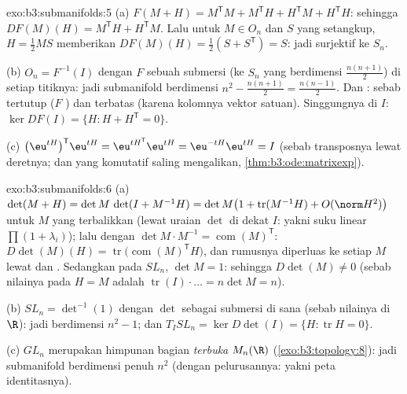 \begin{solution}{exo:b3:submanifolds:5}
(a) $F(M + H) = M^{\mathsf T}M + M^{\mathsf T}H + H^{\mathsf
T}M + H^{\mathsf T}H$: sehingga $DF(M)(H) = M^{\mathsf T}H +
H^{\mathsf T}M$. Lalu untuk $M \in O_n$ dan $S$ yang setangkup, $H =
\frac12MS$ memberikan $DF(M)(H) = \frac12(S + S^{\mathsf T}) = S$:
jadi surjektif ke $S_n$.

(b) $O_n = F^{-1}(I)$ dengan $F$ sebuah submersi (ke $S_n$ yang
berdimensi $\frac{n(n+1)}2$) di setiap titiknya:
jadi submanifold berdimensi $n^2 - \frac{n(n+1)}2 =
\frac{n(n-1)}2$. Dan : sebab tertutup ($F$ ) dan terbatas
(karena kolomnya vektor satuan). Singgungnya di $I$: $\ker DF(I) =
\{H : H + H^{\mathsf T} = 0\}$.

(c) $\bigl(\eu^{tH}\bigr)^{\mathsf T}\eu^{tH} =
\eu^{tH^{\mathsf T}}\eu^{tH} = \eu^{-tH}\eu^{tH} = I$
(sebab transposnya lewat deretnya; dan  yang
komutatif saling mengalikan,
\cref{thm:b3:ode:matrixexp}).
\end{solution}

\begin{solution}{exo:b3:submanifolds:6}
(a) $\det(M + H) = \det M\,\det(I + M^{-1}H) = \det M\bigl(1
+ \operatorname{tr}(M^{-1}H) + O(\norm H^2)\bigr)$ untuk $M$ yang
terbalikkan (lewat uraian $\det$ di dekat $I$: yakni suku linear
$\prod(1 + \lambda_i)$); lalu dengan $\det M\cdot M^{-1} =
\operatorname{com}(M)^{\mathsf T}$:
$D\det(M)(H) = \operatorname{tr}\bigl(\operatorname{com}
(M)^{\mathsf T}H\bigr)$, dan rumusnya diperluas ke setiap $M$
lewat  dan . Sedangkan pada $SL_n$, $\det M = 1$:
sehingga $D\det(M) \ne 0$ (sebab nilainya pada $H = M$ adalah
$\operatorname{tr}(I)\cdot\dots = n\det M = n$).

(b) $SL_n = \det^{-1}(1)$ dengan $\det$ sebagai submersi di sana
(sebab nilainya di $\R$): jadi berdimensi $n^2 - 1$; dan $T_ISL_n = \ker
D\det(I) = \{H : \operatorname{tr}H = 0\}$.

(c) $GL_n$ merupakan himpunan bagian \emph{terbuka} $M_n(\R)$
(\cref{exo:b3:topology:8}): jadi submanifold berdimensi penuh
$n^2$ (dengan pelurusannya: yakni peta identitasnya).
\end{solution}


